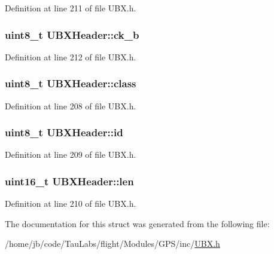 \-Definition at line 211 of file \-U\-B\-X.\-h.

\hypertarget{struct_u_b_x_header_a5fe662d32012b4caaca9b027df4a3d30}{
\subsubsection[{ck\-\_\-b}]{\setlength{\rightskip}{0pt plus 5cm}uint8\-\_\-t {\bf \-U\-B\-X\-Header\-::ck\-\_\-b}}}\label{struct_u_b_x_header_a5fe662d32012b4caaca9b027df4a3d30}


\-Definition at line 212 of file \-U\-B\-X.\-h.

\hypertarget{struct_u_b_x_header_ab7410b764b3d80030e5a8e5167831303}{
\subsubsection[{class}]{\setlength{\rightskip}{0pt plus 5cm}uint8\-\_\-t {\bf \-U\-B\-X\-Header\-::class}}}\label{struct_u_b_x_header_ab7410b764b3d80030e5a8e5167831303}


\-Definition at line 208 of file \-U\-B\-X.\-h.

\hypertarget{struct_u_b_x_header_ae65b35dcbe44c08985ab3ba9e1e04793}{
\subsubsection[{id}]{\setlength{\rightskip}{0pt plus 5cm}uint8\-\_\-t {\bf \-U\-B\-X\-Header\-::id}}}\label{struct_u_b_x_header_ae65b35dcbe44c08985ab3ba9e1e04793}


\-Definition at line 209 of file \-U\-B\-X.\-h.

\hypertarget{struct_u_b_x_header_ac3357d02e8f968e15c24c81716054a85}{
\subsubsection[{len}]{\setlength{\rightskip}{0pt plus 5cm}uint16\-\_\-t {\bf \-U\-B\-X\-Header\-::len}}}\label{struct_u_b_x_header_ac3357d02e8f968e15c24c81716054a85}


\-Definition at line 210 of file \-U\-B\-X.\-h.



\-The documentation for this struct was generated from the following file\-:\begin{DoxyCompactItemize}
\item 
/home/jb/code/\-Tau\-Labs/flight/\-Modules/\-G\-P\-S/inc/\hyperlink{_u_b_x_8h}{\-U\-B\-X.\-h}\end{DoxyCompactItemize}
